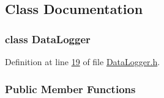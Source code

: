 \subsection{Class Documentation}
\label{class_data_logger}
\subsubsection{class Data\+Logger}


Definition at line \hyperlink{_data_logger_8h_source_l00019}{19} of file \hyperlink{_data_logger_8h_source}{Data\+Logger.\+h}.

\subsubsection*{Public Member Functions}
